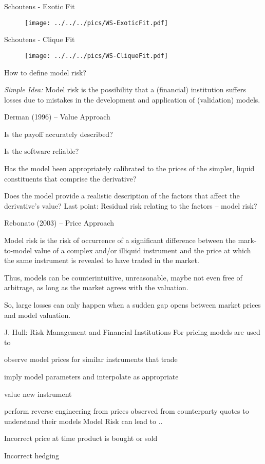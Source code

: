 {Schoutens - Exotic Fit}
\begin{figure}[htp]
\centering
\texttt{[image: ../../../pics/WS-ExoticFit.pdf]}
\end{figure}

{Schoutens - Clique Fit}
\begin{figure}[htp]
\centering
\texttt{[image: ../../../pics/WS-CliqueFit.pdf]}
\end{figure}

{How to define model risk?}
\item {\it Simple Idea:} Model risk is the possibility that a (financial) institution suffers losses due to mistakes in the development and application of (validation) models.

{Derman (1996) -- Value Approach}
\item Is the payoff accurately described?
\item Is the software reliable?
\item Has the model been appropriately calibrated to the prices of the simpler, liquid constituents that comprise the derivative?
\item Does the model provide a realistic description of the factors that affect the derivative's value?
Last point: Residual risk relating to the factors -- model risk?

{Rebonato (2003) -- Price Approach}

\item<1-> Model risk is the risk of occurrence of a significant difference between the mark-to-model value of a complex and/or illiquid instrument and the price at which the same instrument is revealed to have traded in the market.
\item<2-> Thus, models can be counterintuitive, unreasonable, maybe not even free of arbitrage, as long as the market agrees with the valuation.
\item<3-> So, large losses  can only happen when a sudden gap opens between market prices and model valuation.

{J. Hull: Risk Management and Financial Institutions}
For pricing models are used to
\item<1-> observe model prices for similar instruments that trade
\item<2-> imply model parameters and interpolate as appropriate
\item<3-> value new instrument
\item<4-> perform reverse engineering from prices observed from counterparty quotes to understand their models
Model Risk can lead to ..
\item<1->
Incorrect price at time product is bought or sold
\item<2-> Incorrect hedging


